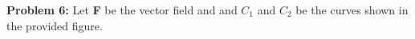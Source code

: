 \documentclass[11pt]{article}
\begin{document}
\begin{tabular}{p{0.2cm}cp{16.2cm}}
	\end{tabular}

\vspace{0.2cm}

{\bf Problem 6:} Let {\bf F} be the vector field and and $C_1$ and $C_2$ be the curves shown in the provided figure.
\end{document}
